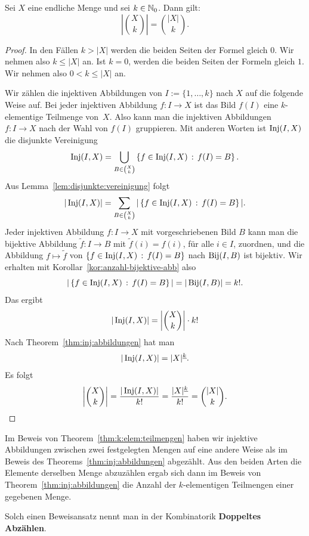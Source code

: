 \begin{thm} \label{thm:k:elem:teilmengen} 
		Sei $X$ eine endliche Menge und sei $k \in \mathbb{N}_0$. Dann gilt: 
		\[
				\left| \binom{X}{k} \right| = \binom{|X|}{k}. 
		\]
\end{thm} 
\begin{proof} 
	In den Fällen $k > |X|$ werden die beiden Seiten der Formel gleich $0$. Wir nehmen also $k \le |X|$ an. Ist $k=0$, werden die beiden Seiten der Formeln gleich $1$. Wir nehmen also $0 < k \le |X|$ an. 
	
	Wir zählen die injektiven Abbildungen von $I:=\{1,\ldots,k\}$ nach $X$ auf die folgende  Weise auf. Bei jeder injektiven Abbildung $f : I \to X$ ist das Bild $f(I)$ eine $k$-elementige Teilmenge von~$X$. Also kann man die injektiven Abbildungen $f: I \to X$  nach der Wahl von $f(I)$ gruppieren. Mit anderen Worten ist $\operatorname{Inj}(I,X)$ die disjunkte Vereinigung
	\[
		\operatorname{Inj}(I,X)  = \bigcup_{B \in \binom{X}{k} } \left\{ f \in \operatorname{Inj}(I,X) \,:\, f(I) = B \right\}. 
	\]
	Aus Lemma~\ref{lem:disjunkte:vereinigung} folgt
	\[
		|\operatorname{Inj}(I,X) | = \sum_{B \in \binom{X}{k} } | \left\{ f \in \operatorname{Inj}(I,X) \,:\, f(I) = B \right\}|. 
	\]
	Jeder injektiven Abbildung $ f: I \to X$ mit vorgeschriebenen Bild $B$ kann man die bijektive Abbildung $\tilde{f} : I \to B$ mit $\tilde{f}(i) = f(i)$, für alle $i \in I$, zuordnen, und die Abbildung $f \mapsto \tilde{f}$ von $\left\{ f \in \operatorname{Inj}(I,X) \,:\, f(I) = B \right\}$ nach $\operatorname{Bij}(I,B)$ ist bijektiv. 
	Wir erhalten mit Korollar~\ref{kor:anzahl-bijektive-abb} also
	\[
			| \left\{ f \in \operatorname{Inj}(I,X) \,:\, f(I) = B \right\}| = |\operatorname{Bij}(I,B)| = k!.
	\]
	Das ergibt
	\[
		|\operatorname{Inj}(I,X) | = \left| \binom{X}{k} \right| \cdot k!
	\]
	Nach Theorem~\ref{thm:inj:abbildungen} hat man 
	\[
		|\operatorname{Inj}(I,X)| = |X|^{\underline{k}}. 
	\]
	Es folgt
	\[
		\left| \binom{X}{k} \right| = \frac{|\operatorname{Inj}(I,X) |}{k!} = \frac{|X|^{\underline{k}}}{k!} = \binom{|X|}{k}. 
	\]
\end{proof} 

\begin{bem} 
	Im Beweis von Theorem~\ref{thm:k:elem:teilmengen} haben wir injektive Abbildungen zwischen zwei festgelegten Mengen auf eine andere Weise als im Beweis des Theorems~\ref{thm:inj:abbildungen} abgezählt. Aus den beiden Arten die Elemente derselben Menge abzuzählen ergab sich dann im Beweis von Theorem~\ref{thm:inj:abbildungen} die Anzahl der $k$-elementigen Teilmengen einer gegebenen Menge.
	
	Solch einen Beweisansatz nennt man in der Kombinatorik \textbf{Doppeltes Abzählen}. 
\end{bem} 

